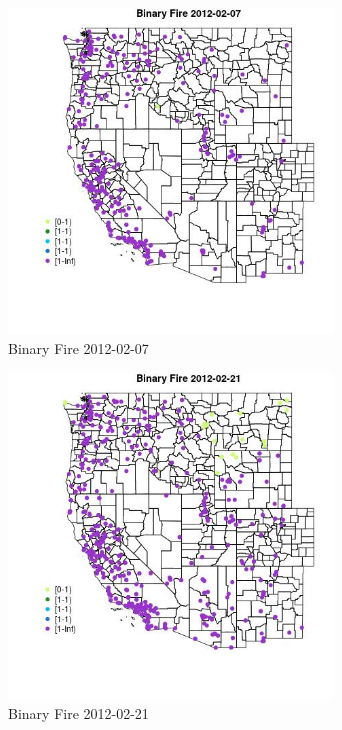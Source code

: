\begin{figure} 
\centering  
\includegraphics[width=0.77\textwidth]{Code_Outputs/Report_ML_input_PM25_Step4_part_f_de_duplicated_aveswNAs_MapObsBinary_Fire2012-02-07.jpg} 
\caption{\label{fig:Report_ML_input_PM25_Step4_part_f_de_duplicated_aveswNAsMapObsBinary_Fire2012-02-07}Binary Fire 2012-02-07} 
\end{figure} 
 

\clearpage 

\begin{figure} 
\centering  
\includegraphics[width=0.77\textwidth]{Code_Outputs/Report_ML_input_PM25_Step4_part_f_de_duplicated_aveswNAs_MapObsBinary_Fire2012-02-21.jpg} 
\caption{\label{fig:Report_ML_input_PM25_Step4_part_f_de_duplicated_aveswNAsMapObsBinary_Fire2012-02-21}Binary Fire 2012-02-21} 
\end{figure} 
 

